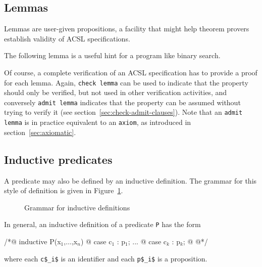 
\subsection{Lemmas}\label{sec:lemmas}
Lemmas are user-given propositions, a facility that might help theorem
provers establish validity of ACSL specifications.

\begin{example}
  The following lemma
  is a useful hint for a program like binary search.
\end{example}

Of course, a complete verification of an ACSL specification has to
provide a proof for each lemma. Again, \lstinline|check lemma| can be used to indicate that the
property should only be verified, but not used in other verification
activities, and conversely \lstinline|admit lemma| indicates that
the property can be assumed without trying to verify it
(see section~\ref{sec:check-admit-clauses}). Note that an \lstinline|admit lemma|
is in practice equivalent to an \lstinline|axiom|, as introduced
in section~\ref{sec:axiomatic}.

\subsection{Inductive predicates}
\label{sec:inductivepredicates}

A predicate may also be defined by an inductive definition. The
grammar for this style of definition is given in
Figure~\ref{fig:gram:inductive}.
\begin{figure}[htp]
  \begin{cadre}
      
    \end{cadre}
  \caption{Grammar for inductive definitions}
\label{fig:gram:inductive}
\end{figure}

In general, an inductive definition of a predicate \lstinline|P| has the form
\begin{listing}{1}
/*@ inductive P(x$_1$,$\ldots$,x$_n$) {
  @   case c$_1$ : p$_1$;
...
  @   case c$_k$ : p$_k$;
  @ }
  @*/
\end{listing}
where each \lstinline|c$_i$| is an identifier and each \lstinline|p$_i$|
is a proposition.

